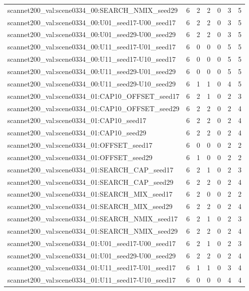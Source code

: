 \begin{table}[t]
\begin{tabular}{lrrrrrr}
scannet200\_val:scene0334\_00:SEARCH\_NMIX\_seed29 & 6 & 2 & 2 & 0 & 3 & 5 \\
scannet200\_val:scene0334\_00:U01\_seed17-U00\_seed17 & 6 & 2 & 2 & 0 & 3 & 5 \\
scannet200\_val:scene0334\_00:U01\_seed29-U00\_seed29 & 6 & 2 & 2 & 0 & 3 & 5 \\
scannet200\_val:scene0334\_00:U11\_seed17-U01\_seed17 & 6 & 0 & 0 & 0 & 5 & 5 \\
scannet200\_val:scene0334\_00:U11\_seed17-U10\_seed17 & 6 & 0 & 0 & 0 & 5 & 5 \\
scannet200\_val:scene0334\_00:U11\_seed29-U01\_seed29 & 6 & 0 & 0 & 0 & 5 & 5 \\
scannet200\_val:scene0334\_00:U11\_seed29-U10\_seed29 & 6 & 1 & 1 & 0 & 4 & 5 \\
scannet200\_val:scene0334\_01:CAP10\_OFFSET\_seed17 & 6 & 2 & 1 & 0 & 2 & 3 \\
scannet200\_val:scene0334\_01:CAP10\_OFFSET\_seed29 & 6 & 2 & 2 & 0 & 2 & 4 \\
scannet200\_val:scene0334\_01:CAP10\_seed17 & 6 & 2 & 2 & 0 & 2 & 4 \\
scannet200\_val:scene0334\_01:CAP10\_seed29 & 6 & 2 & 2 & 0 & 2 & 4 \\
scannet200\_val:scene0334\_01:OFFSET\_seed17 & 6 & 0 & 0 & 0 & 2 & 2 \\
scannet200\_val:scene0334\_01:OFFSET\_seed29 & 6 & 1 & 0 & 0 & 2 & 2 \\
scannet200\_val:scene0334\_01:SEARCH\_CAP\_seed17 & 6 & 2 & 1 & 0 & 2 & 3 \\
scannet200\_val:scene0334\_01:SEARCH\_CAP\_seed29 & 6 & 2 & 2 & 0 & 2 & 4 \\
scannet200\_val:scene0334\_01:SEARCH\_MIX\_seed17 & 6 & 2 & 0 & 0 & 2 & 2 \\
scannet200\_val:scene0334\_01:SEARCH\_MIX\_seed29 & 6 & 2 & 2 & 0 & 2 & 4 \\
scannet200\_val:scene0334\_01:SEARCH\_NMIX\_seed17 & 6 & 2 & 1 & 0 & 2 & 3 \\
scannet200\_val:scene0334\_01:SEARCH\_NMIX\_seed29 & 6 & 2 & 2 & 0 & 2 & 4 \\
scannet200\_val:scene0334\_01:U01\_seed17-U00\_seed17 & 6 & 2 & 1 & 0 & 2 & 3 \\
scannet200\_val:scene0334\_01:U01\_seed29-U00\_seed29 & 6 & 2 & 2 & 0 & 2 & 4 \\
scannet200\_val:scene0334\_01:U11\_seed17-U01\_seed17 & 6 & 1 & 1 & 0 & 3 & 4 \\
scannet200\_val:scene0334\_01:U11\_seed17-U10\_seed17 & 6 & 0 & 0 & 0 & 4 & 4 \\

\end{tabular}
\end{table}
